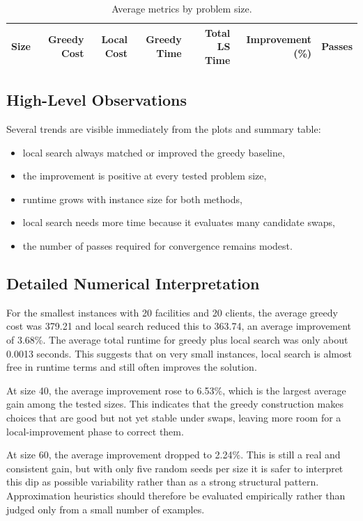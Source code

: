 \documentclass[11pt]{article}
\begin{document}
\begin{table}[H]
    \centering
    \begin{tabular}{rrrrrrr}
        \toprule
        Size & Greedy Cost & Local Cost & Greedy Time & Total LS Time & Improvement (\%) & Passes \\
        \midrule
        
        \bottomrule
    \end{tabular}
    \caption{Average metrics by problem size.}
    \label{tab:summary}
\end{table}

\subsection{High-Level Observations}
Several trends are visible immediately from the plots and summary table:
\begin{itemize}
    \item local search always matched or improved the greedy baseline,
    \item the improvement is positive at every tested problem size,
    \item runtime grows with instance size for both methods,
    \item local search needs more time because it evaluates many candidate swaps,
    \item the number of passes required for convergence remains modest.
\end{itemize}

\subsection{Detailed Numerical Interpretation}
For the smallest instances with 20 facilities and 20 clients, the average greedy cost was 379.21 and local search reduced this to 363.74, an average improvement of 3.68\%. The average total runtime for greedy plus local search was only about 0.0013 seconds. This suggests that on very small instances, local search is almost free in runtime terms and still often improves the solution.

At size 40, the average improvement rose to 6.53\%, which is the largest average gain among the tested sizes. This indicates that the greedy construction makes choices that are good but not yet stable under swaps, leaving more room for a local-improvement phase to correct them.

At size 60, the average improvement dropped to 2.24\%. This is still a real and consistent gain, but with only five random seeds per size it is safer to interpret this dip as possible variability rather than as a strong structural pattern. Approximation heuristics should therefore be evaluated empirically rather than judged only from a small number of examples.
\end{document}
